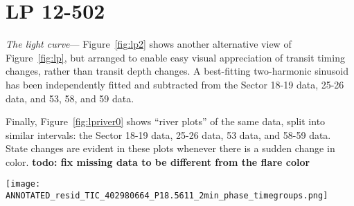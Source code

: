 \documentclass[11pt,twocolumn,tighten]{aastex63}
\begin{document}
\section{LP 12-502}
\label{app:lp}

{\it The light curve}---
Figure~\ref{fig:lp2} shows another alternative view of
Figure~\ref{fig:lp}, but arranged to enable easy visual appreciation
of transit timing changes, rather than transit depth changes.  A
best-fitting two-harmonic sinusoid has been independently fitted and
subtracted from the Sector 18-19 data, 25-26 data, and 53, 58, and 59
data.

Finally, Figure~\ref{fig:lpriver0} shows ``river plots'' of the
same data, split into similar intervals:
the Sector 18-19 data, 25-26 data, 53 data, and 58-59 data.
State changes are evident in these plots whenever there is a sudden
change in color.
{\bf todo: fix missing data to be different from the flare color} 


\begin{figure*}[!t]
	\begin{center}
    \texttt{[image: ANNOTATED\_resid\_TIC\_402980664\_P18.5611\_2min\_phase\_timegroups.png]}
    	\end{center}
    \vspace{-0.4cm}
		\caption{
	      {\bf Alternative view of the evolution of LP 12-502}
	      (Figure~\ref{fig:lp}), arranged to emphasize changes in transit
	      times.  There are 200 binned black points per $P$=18.5611\,hr cycle; a two-harmonic
	      sinusoid has been subtracted from the PDC\_SAP light curve.
	      Vertical gray lines are underplotted to help guide the eye to instances
	      in which preferred dip phases synchronize over long baselines.
	      The orange and green lines guide the eye to where dips
	      change the positions of their local minima; orange
        lines have periods slightly less than $P$, the green line has
        a period greater than $P$.
		}
		\label{fig:lp2}
\end{figure*}
\end{document}
